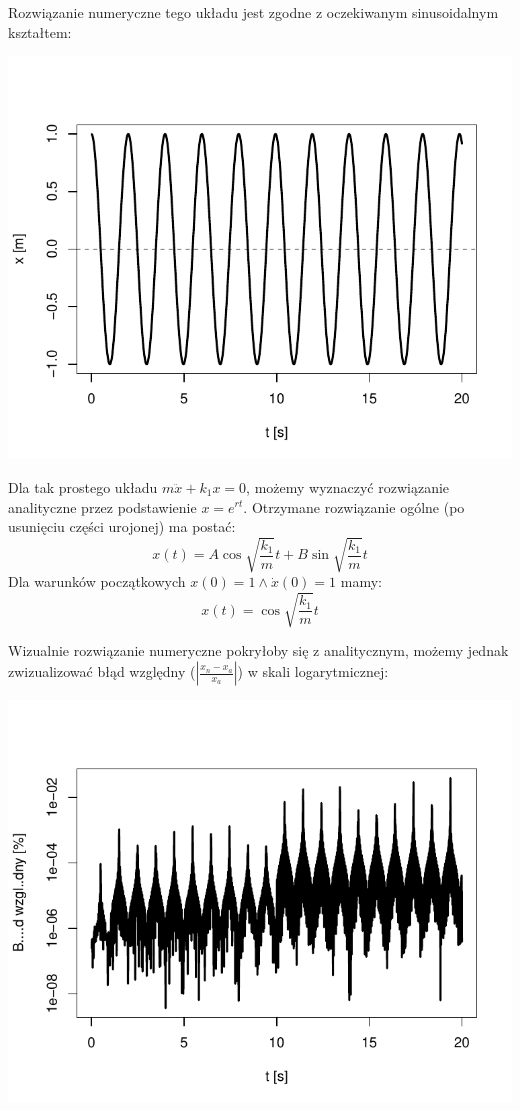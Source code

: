 \documentclass[12pt]{sprawozdanie}
\begin{document}
Rozwiązanie numeryczne tego układu jest zgodne z oczekiwanym
sinusoidalnym kształtem:

\begin{center}\includegraphics{info2_files/figure-latex/linear-solution-1} \end{center}

Dla tak prostego układu \(m\ddot x + k_1x = 0\), możemy wyznaczyć
rozwiązanie analityczne przez podstawienie \(x=e^{rt}\). Otrzymane
rozwiązanie ogólne (po usunięciu części urojonej) ma postać:
\[x(t) = A \cos{\sqrt{\frac{k_1}{m}}t} + B \sin{\sqrt{\frac{k_1}{m}}t}\]
Dla warunków początkowych \(x(0)=1\land \dot x(0)=1\) mamy:
\[x(t) = \cos{\sqrt{\frac{k_1}{m}}t}\]

Wizualnie rozwiązanie numeryczne pokryłoby się z analitycznym, możemy
jednak zwizualizować błąd względny
(\(\left|\frac{x_n-x_a}{x_a}\right|\)) w skali logarytmicznej:

\begin{center}\includegraphics{info2_files/figure-latex/linear-error-1} \end{center}
\end{document}
